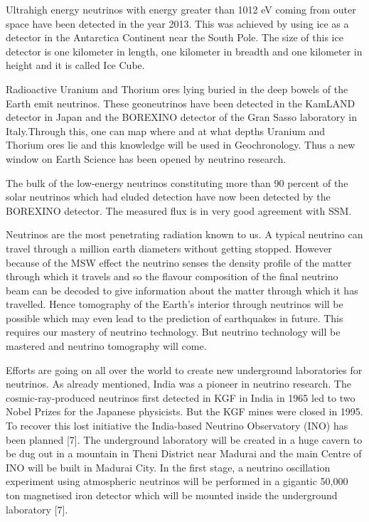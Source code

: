 Ultrahigh energy neutrinos with energy greater than 1012 eV coming from
outer space have been detected in the year 2013. This was achieved by using
ice as a detector in the Antarctica Continent near the South Pole. The size
of this ice detector is one kilometer in length, one kilometer in breadth and
one kilometer in height and it is called Ice Cube.

Radioactive Uranium and Thorium ores lying buried in the deep bowels
of the Earth emit neutrinos. These geoneutrinos have been detected in the
KamLAND detector in Japan and the BOREXINO detector of the Gran
Sasso laboratory in Italy.\break Through this, one can map where and at what
depths Uranium and Thorium ores lie and this knowledge will be used in Geochronology. Thus a new window on Earth Science has been opened by
neutrino research.

The bulk of the low-energy neutrinos constituting more than 90 percent
of the solar neutrinos which had eluded detection have now been detected
by the BOREXINO detector. The measured flux is in very good agreement
with SSM.

Neutrinos are the most penetrating radiation known to us. A typical neutrino can travel through a million earth diameters without getting stopped.
However because of the MSW effect the neutrino senses the density profile
of the matter through which it travels and so the flavour composition of the
final neutrino beam can be decoded to give information about the matter
through which it has travelled. Hence tomography of the Earth’s interior
through neutrinos will be possible which may even lead to the prediction of
earthquakes in future. This requires our mastery of neutrino technology. But
neutrino technology will be mastered and neutrino tomography will come.


Efforts are going on all over the world to create new underground laboratories for neutrinos. As already mentioned, India was a pioneer in neutrino
research. The cosmic-ray-produced neutrinos first detected in KGF in India
in 1965 led to two Nobel Prizes for the Japanese physicists. But the KGF
mines were closed in 1995. To recover this lost initiative the India-based
Neutrino Observatory (INO) has been planned [7]. The underground laboratory will be created in a huge cavern to be dug out in a mountain in Theni
District near Madurai and the main Centre of INO will be built in Madurai
City. In the first stage, a neutrino oscillation experiment using atmospheric
neutrinos will be performed in a gigantic 50,000 ton magnetised iron detector
which will be mounted inside the underground laboratory [7].

